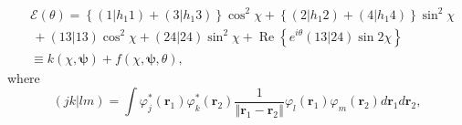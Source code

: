 \documentclass[aps,preprint]{revtex4}%
\begin{document}
\begin{align*}
&  \mathcal{E}\left(  \theta\right)  =\left\{  \left(  1\left\vert
h_{1}1\right.  \right)  +\left(  3\left\vert h_{1}3\right.  \right)  \right\}
\cos^{2}\chi+\left\{  \left(  2\left\vert h_{1}2\right.  \right)  +\left(
4\left\vert h_{1}4\right.  \right)  \right\}  \sin^{2}\chi\\
&  \,+\left(  \left.  13\right\vert 13\right)  \cos^{2}\chi+\left(  \left.
24\right\vert 24\right)  \sin^{2}\chi+\operatorname{Re}\left\{  e^{i\theta
}\left(  \left.  13\right\vert 24\right)  \sin2\chi\right\}  \\
&  \equiv k\left(  \chi,\boldsymbol{\psi}\right)  +f\left(  \chi
,\boldsymbol{\psi},\theta\right)  ,
\end{align*}
where
\[
\left(  \left.  jk\right\vert lm\right)  =\int\varphi_{j}^{\ast}\left(
\boldsymbol{r}_{1}\right)  \varphi_{k}^{\ast}\left(  \boldsymbol{r}%
_{2}\right)  \frac{1}{\left\Vert \boldsymbol{r}_{1}-\boldsymbol{r}%
_{2}\right\Vert }\varphi_{l}\left(  \boldsymbol{r}_{1}\right)  \varphi
_{m}\left(  \boldsymbol{r}_{2}\right)  d\boldsymbol{r}_{1}d\boldsymbol{r}_{2},
\]
%
\end{document}

